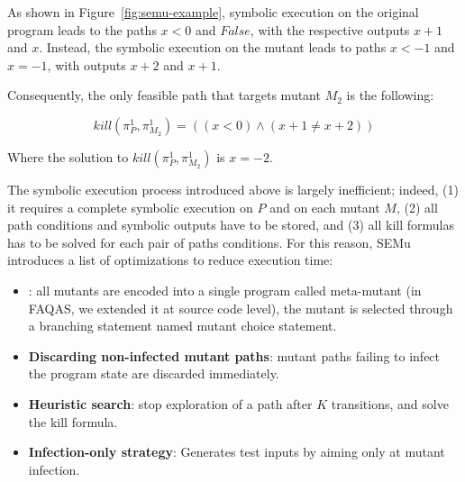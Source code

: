 As shown in Figure~\ref{fig:semu-example}, symbolic execution on the original program leads to the paths $x < 0$ and $False$, with the respective outputs $x + 1$ and $x$.
Instead, the symbolic execution on the mutant leads to paths $x < -1$ and $x = -1$, with outputs $x + 2$ and $x + 1$.

Consequently, the only feasible path that targets mutant $M_2$ is the following:

\begin{equation}
	kill(\pi_{P}^{1}, \pi_{M_2}^{1}) = ((x < 0) \wedge (x + 1 \neq x + 2) )
\end{equation}

Where the solution to $kill(\pi_{P}^{1}, \pi_{M_2}^{1})$ is $x = -2$.

The symbolic execution process introduced above is largely inefficient; indeed,
(1) it requires a complete symbolic execution on $P$ and on each mutant $M$, (2) all path conditions and symbolic outputs have to be stored, and (3) all kill formulas has to be solved for each pair of paths conditions. 
For this reason, SEMu introduces a list of optimizations to reduce execution time:

\begin{itemize}
	\item {}: all mutants are encoded into a single program called meta-mutant (in FAQAS, we extended it at source code level), the mutant is selected through a branching statement named mutant choice statement.
	\item \textbf{Discarding non-infected mutant paths}: mutant paths failing to infect the program state are discarded immediately.
	\item \textbf{Heuristic search}: stop exploration of a path after $K$ transitions, and solve the kill formula.
	\item \textbf{Infection-only strategy}: Generates test inputs by aiming only at mutant infection.
\end{itemize}


